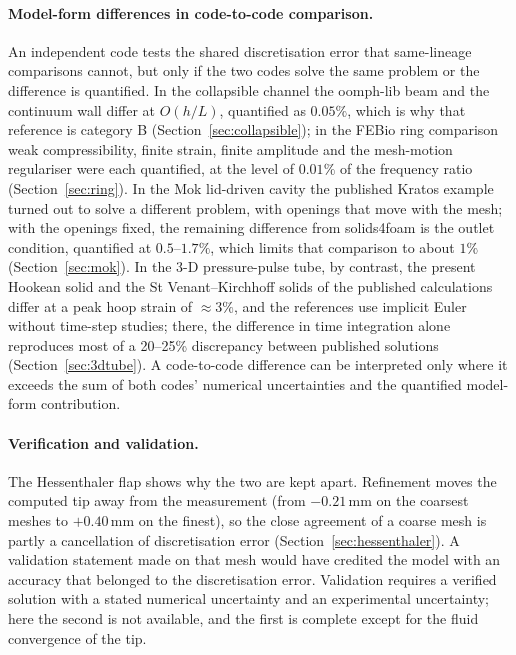 \paragraph{Model-form differences in code-to-code comparison.}
An independent code tests the shared discretisation error that same-lineage comparisons cannot, but only if the two codes solve the same problem or the difference is quantified.
In the collapsible channel the oomph-lib beam and the continuum wall differ at $O(h/L)$, quantified as $0.05\%$, which is why that reference is category B (Section~\ref{sec:collapsible}); in the FEBio ring comparison weak compressibility, finite strain, finite amplitude and the mesh-motion regulariser were each quantified, at the level of $0.01\%$ of the frequency ratio (Section~\ref{sec:ring}).
In the Mok lid-driven cavity the published Kratos example turned out to solve a different problem, with openings that move with the mesh; with the openings fixed, the remaining difference from solids4foam is the outlet condition, quantified at $0.5$--$1.7\%$, which limits that comparison to about $1\%$ (Section~\ref{sec:mok}).
In the 3-D pressure-pulse tube, by contrast, the present Hookean solid and the St Venant--Kirchhoff solids of the published calculations differ at a peak hoop strain of $\approx3\%$, and the references use implicit Euler without time-step studies; there, the difference in time integration alone reproduces most of a 20--25\% discrepancy between published solutions (Section~\ref{sec:3dtube}).
A code-to-code difference can be interpreted only where it exceeds the sum of both codes' numerical uncertainties and the quantified model-form contribution.

\paragraph{Verification and validation.}
The Hessenthaler flap shows why the two are kept apart.
Refinement moves the computed tip away from the measurement (from $-0.21\,\mathrm{mm}$ on the coarsest meshes to $+0.40\,\mathrm{mm}$ on the finest), so the close agreement of a coarse mesh is partly a cancellation of discretisation error (Section~\ref{sec:hessenthaler}).
A validation statement made on that mesh would have credited the model with an accuracy that belonged to the discretisation error.
Validation requires a verified solution with a stated numerical uncertainty and an experimental uncertainty; here the second is not available, and the first is complete except for the fluid convergence of the tip.

